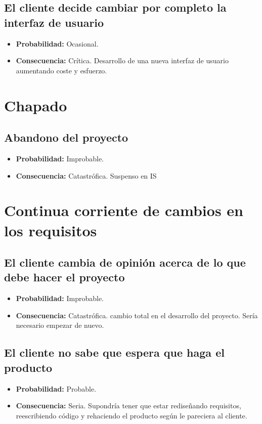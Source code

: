 \documentclass[spanish,a4paper,12pt]{report}	%
\begin{document}
\subsection*{El cliente decide cambiar por completo la interfaz de usuario}
	\begin{itemize}
		\item \textbf {Probabilidad: }Ocasional.
		\item \textbf {Consecuencia: }Crítica. Desarrollo de una nueva interfaz de usuario aumentando coste y esfuerzo.
	\end{itemize}

%
\section{Chapado}

\subsection*{Abandono del proyecto}
	\begin{itemize}
		\item \textbf {Probabilidad: }Improbable.
		\item \textbf {Consecuencia: }Catastrófica. Suspenso en IS 	%
	\end{itemize}

%
\section{Continua corriente de cambios en los requisitos}

\subsection*{El cliente cambia de opinión acerca de lo que debe hacer el proyecto}
	\begin{itemize}
		\item \textbf {Probabilidad: }Improbable.
		\item \textbf {Consecuencia: }Catastrófica. cambio total en el desarrollo del proyecto. Sería necesario empezar de nuevo.
	\end{itemize}

\subsection*{El cliente no sabe que espera que haga el producto}	
	\begin{itemize}
		\item \textbf {Probabilidad: }Probable.

		\item \textbf {Consecuencia: }Seria. Supondría tener que estar rediseñando requisitos, reescribiendo código y rehaciendo el producto según le pareciera al cliente.
	\end{itemize}
\end{document}
